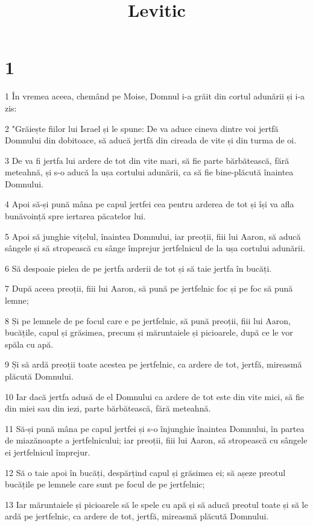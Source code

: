 

\title{Levitic}


\chapter{1}

\par 1 În vremea aceea, chemând pe Moise, Domnul i-a grăit din cortul adunării și i-a zis:
\par 2 "Grăiește fiilor lui Israel și le spune: De va aduce cineva dintre voi jertfă Domnului din dobitoace, să aducă jertfă din cireada de vite și din turma de oi.
\par 3 De va fi jertfa lui ardere de tot din vite mari, să fie parte bărbătească, fără meteahnă, și s-o aducă la ușa cortului adunării, ca să fie bine-plăcută înaintea Domnului.
\par 4 Apoi să-și pună mâna pe capul jertfei cea pentru arderea de tot și își va afla bunăvoință spre iertarea păcatelor lui.
\par 5 Apoi să junghie vițelul, înaintea Domnului, iar preoții, fiii lui Aaron, să aducă sângele și să stropească cu sânge împrejur jertfelnicul de la ușa cortului adunării.
\par 6 Să despoaie pielea de pe jertfa arderii de tot și să taie jertfa în bucăți.
\par 7 După aceea preoții, fiii lui Aaron, să pună pe jertfelnic foc și pe foc să pună lemne;
\par 8 Și pe lemnele de pe focul care e pe jertfelnic, să pună preoții, fiii lui Aaron, bucățile, capul și grăsimea, precum și măruntaiele și picioarele, după ce le vor spăla cu apă.
\par 9 Și să ardă preoții toate acestea pe jertfelnic, ca ardere de tot, jertfă, mireasmă plăcută Domnului.
\par 10 Iar dacă jertfa adusă de el Domnului ca ardere de tot este din vite mici, să fie din miei sau din iezi, parte bărbătească, fără meteahnă.
\par 11 Să-și pună mâna pe capul jertfei și s-o înjunghie înaintea Domnului, în partea de miazănoapte a jertfelnicului; iar preoții, fiii lui Aaron, să stropească cu sângele ei jertfelnicul împrejur.
\par 12 Să o taie apoi în bucăți, despărțind capul și grăsimea ei; să așeze preotul bucățile pe lemnele care sunt pe focul de pe jertfelnic;
\par 13 Iar măruntaiele și picioarele să le spele cu apă și să aducă preotul toate și să le ardă pe jertfelnic, ca ardere de tot, jertfă, mireasmă plăcută Domnului.
